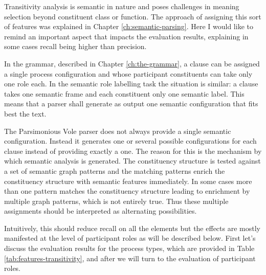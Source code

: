     Transitivity analysis is semantic in nature and poses challenges in meaning selection beyond constituent class or function. The approach of assigning this sort of features was explained in Chapter \ref{ch:semantic-parsing}. Here I would like to remind an important aspect that impacts the evaluation results, explaining in some cases recall being higher than precision.
    
    In the grammar, described in Chapter \ref{ch:the-grammar}, a clause can be assigned a single process configuration and whose participant constituents can take only one role each. In the semantic role labelling task the situation is similar: a clause takes one semantic frame and each constituent only one semantic label. This means that a parser shall generate as output one semantic configuration that fits best the text. 
    
    The Parsimonious Vole parser does not always provide a single semantic configuration. Instead it generates one or several possible configurations for each clause instead of providing exactly a one. The reason for this is the mechanism by which semantic analysis is generated. The constituency structure is tested against a set of semantic graph patterns and the matching patterns enrich the constituency structure with semantic features immediately. In some cases more than one pattern matches the constituency structure leading to enrichment by multiple graph patterns, which is not entirely true. Thus these multiple assignments should be interpreted as alternating possibilities.  
    
    Intuitively, this should reduce recall on all the elements but the effects are mostly manifested at the level of participant roles as will be described below. First let's discuss the evaluation results for the process types, which are provided in Table \ref{tab:features-transitivity}, and after we will turn to the evaluation of participant roles.
    
